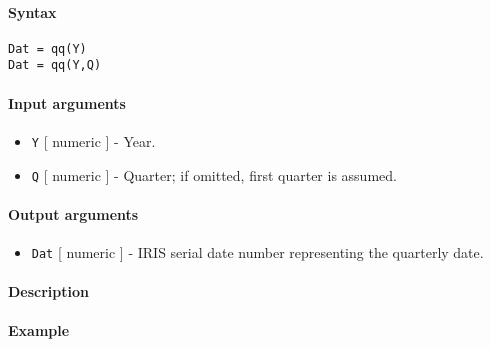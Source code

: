 


	\paragraph{Syntax}\label{syntax}

\begin{verbatim}
Dat = qq(Y)
Dat = qq(Y,Q)
\end{verbatim}

\paragraph{Input arguments}\label{input-arguments}

\begin{itemize}
\item
  \texttt{Y} {[} numeric {]} - Year.
\item
  \texttt{Q} {[} numeric {]} - Quarter; if omitted, first quarter is
  assumed.
\end{itemize}

\paragraph{Output arguments}\label{output-arguments}

\begin{itemize}
\itemsep1pt\parskip0pt
\item
  \texttt{Dat} {[} numeric {]} - IRIS serial date number representing
  the quarterly date.
\end{itemize}

\paragraph{Description}\label{description}

\paragraph{Example}\label{example}


